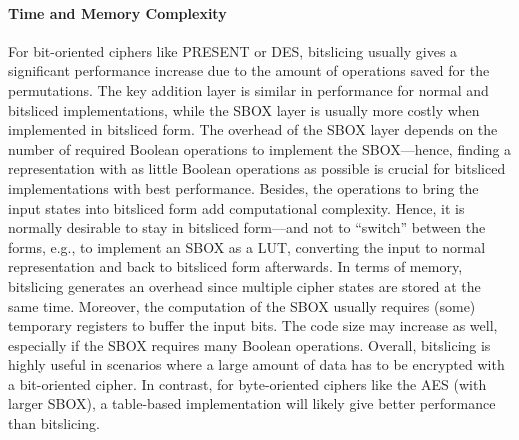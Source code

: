 \paragraph{Time and Memory Complexity}
For bit-oriented ciphers like PRESENT or \ac{DES}, bitslicing usually gives a significant performance increase due to the amount of operations saved for the permutations. The key addition layer is similar in performance for normal and bitsliced implementations, while the \ac{SBOX} layer is usually more costly when implemented in bitsliced form. The overhead of the \ac{SBOX} layer depends on the number of required Boolean operations to implement the \ac{SBOX}---hence, finding a representation with as little Boolean operations as possible is crucial for bitsliced implementations with best performance.
%
Besides, the operations to bring the input states into bitsliced form add computational complexity. Hence, it is normally desirable to stay in bitsliced form---and not to ``switch'' between the forms, e.g., to implement an \ac{SBOX} as a \ac{LUT}, converting the input to normal representation and back to bitsliced form afterwards. 
%
In terms of memory, bitslicing generates an overhead since multiple cipher states are stored at the same time. Moreover, the computation of the \ac{SBOX} usually requires (some) temporary registers to buffer the input bits. The code size may increase as well, especially if the \ac{SBOX} requires many Boolean operations.
Overall, bitslicing is highly useful in scenarios where a large amount of data has to be encrypted with a bit-oriented cipher. In contrast, for byte-oriented ciphers like the \ac{AES} (with larger \ac{SBOX}), a table-based implementation will likely give better performance than bitslicing.

